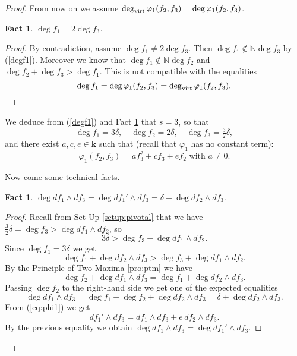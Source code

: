 \documentclass[reqno,oneside,11pt]{amsart}
\theoremstyle{plain}
\newtheorem{fact}[theorem]{Fact}
\theoremstyle{definition}
\newcommand{\N}{\mathbb{N}}
\newcommand{\K}{\mathbf{k}}
\renewcommand{\phi}{\varphi}
\newcommand{\dvirt}{\deg_{\text{\rm virt}}}
\begin{document}
\begin{proof}
From now on we assume $\dvirt \phi_1(f_2,f_3) = \deg \phi_1(f_2,f_3)$.

\begin{fact}
\label{fact:deg f1}
$\deg f_1 = 2\deg f_3$.
\end{fact}

\begin{proof}
By contradiction, assume $\deg f_1 \neq 2\deg f_3$.
Then $\deg f_1 \not\in \N \deg f_3$ by (\ref{degf1}).
Moreover we know that $\deg f_1 \not\in \N \deg f_2$ and $\deg f_2 + \deg f_3 >
\deg f_1$.
This is not compatible with the equalities
\begin{equation*}
\deg f_1 = \deg \phi_1(f_2,f_3) = \dvirt \phi_1(f_2,f_3). \qedhere
\end{equation*}
\end{proof}

We deduce from (\ref{degf1}) and Fact \ref{fact:deg f1} that $s = 3$, so that
$$\deg f_1 = 3\delta, \quad \deg f_2 = 2\delta, \quad \deg f_3 = \tfrac{3}{2}
\delta,$$
and there exist $a,c,e \in \K$ such that (recall that $\phi_1$ has no constant
term):
\begin{equation}
\label{eq:phi1}
\phi_1(f_2,f_3) = af_3^2 + cf_3 + ef_2 \text{ with } a\neq 0.
\end{equation}

Now come some technical facts.

\begin{fact}
\label{fact:df1 df3}
$\deg df_1 \wedge df_3 = \deg df_1' \wedge df_3 = \delta + \deg df_2 \wedge df_3
.$
\end{fact}

\begin{proof}
Recall from Set-Up \ref{setup:pivotal} that we have $\frac{3}{2}\delta = \deg
f_3 > \deg df_1 \wedge df_2 $, so
$$3\delta > \deg f_3 + \deg   df_1 \wedge df_2.$$
Since $\deg f_1 = 3\delta$ we get
$$\deg f_1 + \deg   df_2 \wedge df_3 > \deg f_3 + \deg   df_1 \wedge df_2.$$
By the Principle of Two Maxima \ref{pro:ptm} we have
$$\deg f_2 + \deg   df_1 \wedge df_3 = \deg f_1 + \deg   df_2 \wedge df_3.$$
Passing $\deg f_2$ to the right-hand side we get one of the expected
equalities
\begin{equation*}
\deg   df_1 \wedge df_3 = \deg f_1 - \deg f_2 + \deg   df_2 \wedge df_3 = \delta + \deg df_2 \wedge df_3.
\end{equation*}
From (\ref{eq:phi1}) we get
$$df_1' \wedge df_3 =  df_1 \wedge df_3 + e\,df_2\wedge df_3.$$
By the previous equality we obtain $\deg  df_1 \wedge df_3 = \deg df_1' \wedge df_3$.
\end{proof}


\end{proof}
\end{document}

